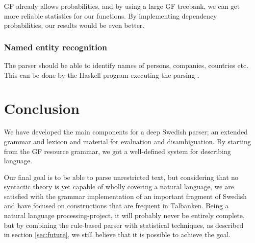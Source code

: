 \documentclass{report}
\begin{document}
GF already allows probabilities, and by using a large
GF treebank, we can get more reliable statistics for our functions. 
By implementing dependency probabilities, our results would be even better.

\subsubsection{Named entity recognition}
The parser should be able to identify names of persons, companies, countries etc.
This can be done by the Haskell program executing the parsing \cite{patent}.






\section{Conclusion}


We have developed the main components
for a deep Swedish parser; an extended grammar and lexicon and material for
evaluation and disambiguation. %
By starting from the GF resource grammar, we got a well-defined system for
describing language. 


Our final goal is to be able to parse unrestricted text, but considering that
no syntactic theory is yet capable
of wholly covering a natural language, we are satisfied with %
the grammar implementation of an important fragment of Swedish and have
focused on constructions that are frequent in Talbanken. 
Being a natural language processing-project, it will probably never be
entirely complete, but by combining the rule-based parser with statistical
techniques, 
as described in section \ref{sec:future},
we still believe that it is possible to achieve the goal. 
\\
\end{document}
